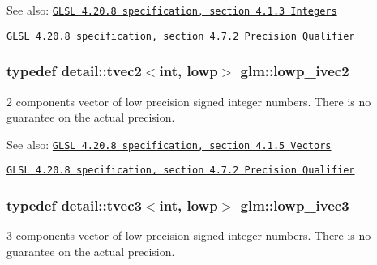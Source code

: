 \begin{Desc}
\item[See also:]\href{http://www.opengl.org/registry/doc/GLSLangSpec.4.20.8.pdf}{\tt GLSL 4.20.8 specification, section 4.1.3 Integers} 

\href{http://www.opengl.org/registry/doc/GLSLangSpec.4.20.8.pdf}{\tt GLSL 4.20.8 specification, section 4.7.2 Precision Qualifier} \end{Desc}
\hypertarget{group__core__precision_g562c5c67d6431ab88fc4a032239e2137}{
\subsubsection[lowp\_\-ivec2]{\setlength{\rightskip}{0pt plus 5cm}typedef detail::tvec2$<$int, lowp$>$ {\bf glm::lowp\_\-ivec2}}}
\label{group__core__precision_g562c5c67d6431ab88fc4a032239e2137}


2 components vector of low precision signed integer numbers. There is no guarantee on the actual precision.

\begin{Desc}
\item[See also:]\href{http://www.opengl.org/registry/doc/GLSLangSpec.4.20.8.pdf}{\tt GLSL 4.20.8 specification, section 4.1.5 Vectors} 

\href{http://www.opengl.org/registry/doc/GLSLangSpec.4.20.8.pdf}{\tt GLSL 4.20.8 specification, section 4.7.2 Precision Qualifier} \end{Desc}
\hypertarget{group__core__precision_gd133fec5c629e3f712c1270e15144e6c}{
\subsubsection[lowp\_\-ivec3]{\setlength{\rightskip}{0pt plus 5cm}typedef detail::tvec3$<$int, lowp$>$ {\bf glm::lowp\_\-ivec3}}}
\label{group__core__precision_gd133fec5c629e3f712c1270e15144e6c}


3 components vector of low precision signed integer numbers. There is no guarantee on the actual precision.

